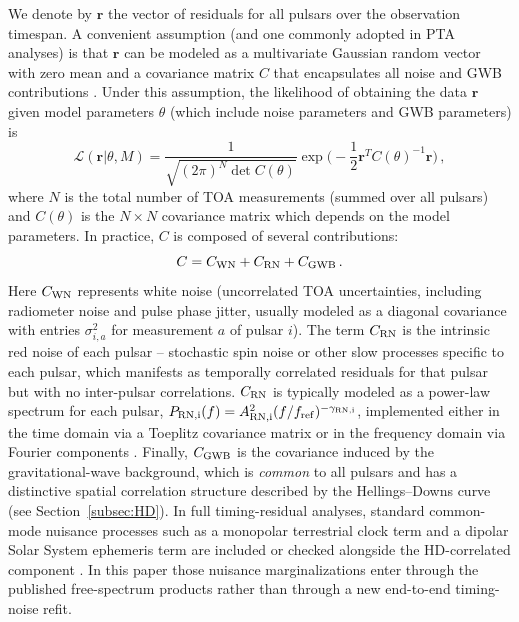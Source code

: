 \documentclass[symmetry,article,submit,pdftex,moreauthors]{Definitions/mdpi}
\begin{document}
We denote by $\mathbf{r}$ the vector of residuals for all pulsars over the observation timespan. A convenient assumption (and one commonly adopted in PTA analyses) is that $\mathbf{r}$ can be modeled as a multivariate Gaussian random vector with zero mean and a covariance matrix $C$ that encapsulates all noise and GWB contributions \cite{NANOGrav15-Methods}. Under this assumption, the likelihood of obtaining the data $\mathbf{r}$ given model parameters $\theta$ (which include noise parameters and GWB parameters) is 
\begin{equation}\label{eq:likelihood}
    \mathcal{L}(\mathbf{r}|\theta, M) = \frac{1}{\sqrt{(2\pi)^{N}\det C(\theta)}} \exp\!\Big(-\frac{1}{2}\mathbf{r}^T C(\theta)^{-1}\mathbf{r}\Big)\,,
\end{equation}
where $N$ is the total number of TOA measurements (summed over all pulsars) and $C(\theta)$ is the $N\times N$ covariance matrix which depends on the model parameters. In practice, $C$ is composed of several contributions:
\begin{equation}\label{eq:cov_components}
    C = C_{\rm WN} + C_{\rm RN} + C_{\rm GWB}\,.
\end{equation}
Here $C_{\rm WN}$ represents white noise (uncorrelated TOA uncertainties, including radiometer noise and pulse phase jitter, usually modeled as a diagonal covariance with entries $\sigma_{i,a}^2$ for measurement $a$ of pulsar $i$). The term $C_{\rm RN}$ is the intrinsic red noise of each pulsar -- stochastic spin noise or other slow processes specific to each pulsar, which manifests as temporally correlated residuals for that pulsar but with no inter-pulsar correlations. $C_{\rm RN}$ is typically modeled as a power-law spectrum for each pulsar, $P_{\rm RN,i}(f) = A_{\rm RN,i}^2 (f/f_\mathrm{ref})^{-\gamma_{\rm RN,i}}$, implemented either in the time domain via a Toeplitz covariance matrix or in the frequency domain via Fourier components \cite{NANOGrav15-Methods}. Finally, $C_{\rm GWB}$ is the covariance induced by the gravitational-wave background, which is \emph{common} to all pulsars and has a distinctive spatial correlation structure described by the Hellings--Downs curve (see Section~\ref{subsec:HD}). In full timing-residual analyses, standard common-mode nuisance processes such as a monopolar terrestrial clock term and a dipolar Solar System ephemeris term are included or checked alongside the HD-correlated component \cite{NANOGrav15-Methods}. In this paper those nuisance marginalizations enter through the published free-spectrum products rather than through a new end-to-end timing-noise refit.
\end{document}

